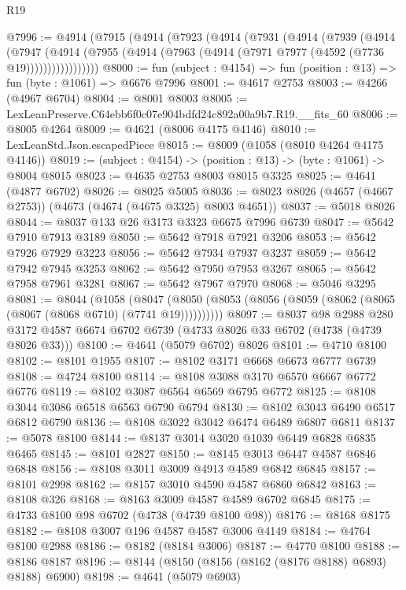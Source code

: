 \begin{lexlean}{R19}
\begin{coremodule}
@7996 := @4914
    (@7915
      (@4914
        (@7923
          (@4914
            (@7931
              (@4914
                (@7939
                  (@4914
                    (@7947
                      (@4914
                        (@7955 (@4914 (@7963 (@4914 (@7971 @7977 (@4592 (@7736 @19)))))))))))))))))
@8000 := fun (subject : @4154) => fun (position : @13) => fun (byte : @1061) => @6676 @7996
@8001 := @4617 @2753
@8003 := @4266 (@4967 @6704)
@8004 := @8001 @8003
@8005 := LexLeanPreserve.C64ebb6f0c07e904bdfd24c892a00a9b7.R19.__fits_60
@8006 := @8005 @4264
@8009 := @4621 (@8006 @4175 @4146)
@8010 := LexLeanStd.Json.escapedPiece
@8015 := @8009 (@1058 (@8010 @4264 @4175 @4146))
@8019 := (subject : @4154) -> (position : @13) -> (byte : @1061) -> @8004 @8015
@8023 := @4635 @2753 @8003 @8015 @3325
@8025 := @4641 (@4877 @6702)
@8026 := @8025 @5005
@8036 := @8023 @8026 (@4657 (@4667 @2753)) (@4673 (@4674 (@4675 @3325) @8003 @4651))
@8037 := @5018 @8026
@8044 := @8037 @133 @26 @3173 @3323 @6675 @7996 @6739
@8047 := @5642 @7910 @7913 @3189
@8050 := @5642 @7918 @7921 @3206
@8053 := @5642 @7926 @7929 @3223
@8056 := @5642 @7934 @7937 @3237
@8059 := @5642 @7942 @7945 @3253
@8062 := @5642 @7950 @7953 @3267
@8065 := @5642 @7958 @7961 @3281
@8067 := @5642 @7967 @7970
@8068 := @5046 @3295
@8081 := @8044
    (@1058
      (@8047 (@8050 (@8053 (@8056 (@8059 (@8062 (@8065 (@8067 (@8068 @6710) (@7741 @19))))))))))
@8097 := @8037
    @98
    @2988
    @280
    @3172
    @4587
    @6674
    @6702
    @6739
    (@4733 @8026 @33 @6702 (@4738 (@4739 @8026 @33)))
@8100 := @4641 (@5079 @6702) @8026
@8101 := @4710 @8100
@8102 := @8101 @1955
@8107 := @8102 @3171 @6668 @6673 @6777 @6739
@8108 := @4724 @8100
@8114 := @8108 @3088 @3170 @6570 @6667 @6772 @6776
@8119 := @8102 @3087 @6564 @6569 @6795 @6772
@8125 := @8108 @3044 @3086 @6518 @6563 @6790 @6794
@8130 := @8102 @3043 @6490 @6517 @6812 @6790
@8136 := @8108 @3022 @3042 @6474 @6489 @6807 @6811
@8137 := @5078 @8100
@8144 := @8137 @3014 @3020 @1039 @6449 @6828 @6835 @6465
@8145 := @8101 @2827
@8150 := @8145 @3013 @6447 @4587 @6846 @6848
@8156 := @8108 @3011 @3009 @4913 @4589 @6842 @6845
@8157 := @8101 @2998
@8162 := @8157 @3010 @4590 @4587 @6860 @6842
@8163 := @8108 @326
@8168 := @8163 @3009 @4587 @4589 @6702 @6845
@8175 := @4733 @8100 @98 @6702 (@4738 (@4739 @8100 @98))
@8176 := @8168 @8175
@8182 := @8108 @3007 @196 @4587 @4587 @3006 @4149
@8184 := @4764 @8100 @2988
@8186 := @8182 (@8184 @3006)
@8187 := @4770 @8100
@8188 := @8186 @8187
@8196 := @8144 (@8150 (@8156 (@8162 (@8176 @8188) @6893) @8188) @6900)
@8198 := @4641 (@5079 @6903)

\end{coremodule}
\end{lexlean}
